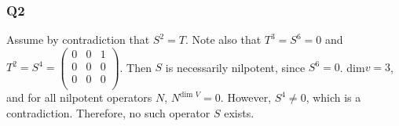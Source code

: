\documentclass{article}
\begin{document}
\subsubsection*{Q2}
Assume by contradiction that $S^{2} = T$. Note also that $T^{3} = S^{6} = 0$ and $T^{2} = S^{4} = \begin{pmatrix}
0 & 0 & 1\\
0 & 0 & 0\\
0 & 0 & 0\\
\end{pmatrix}
$.
Then $S$ is necessarily nilpotent, since $S^{6} = 0$. dim$v = 3$, and for all nilpotent operators $N$, $N^{\text{dim } V} = 0$. However, $S^{4} \neq 0$, which is a contradiction. Therefore, no such operator $S$ exists.
\end{document}
